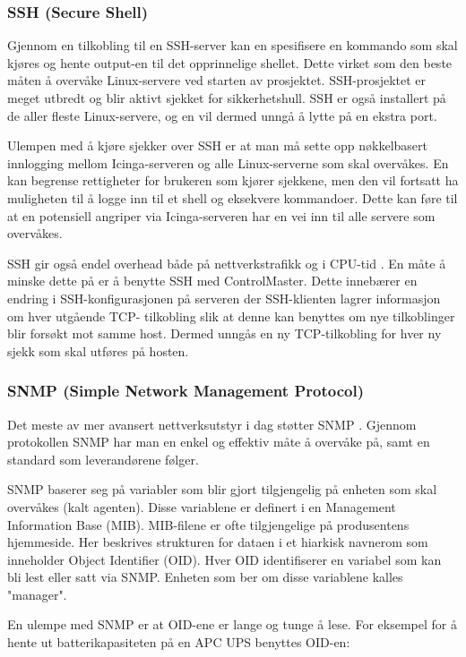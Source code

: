 \subsubsection{SSH (Secure Shell)}
Gjennom en tilkobling til en SSH-server kan en spesifisere en kommando som skal kjøres og hente output-en til det opprinnelige shellet. Dette virket som den beste måten å overvåke Linux-servere ved starten av prosjektet. SSH-prosjektet er meget utbredt og blir aktivt sjekket for sikkerhetshull. SSH er også installert på de aller fleste Linux-servere, og en vil dermed unngå å lytte på en ekstra port.

Ulempen med å kjøre sjekker over SSH er at man må sette opp nøkkelbasert innlogging mellom Icinga-serveren og alle Linux-serverne som skal overvåkes. En kan begrense rettigheter for brukeren som kjører sjekkene, men den vil fortsatt ha muligheten til å logge inn til et shell og eksekvere kommandoer. Dette kan føre til at en potensiell angriper via Icinga-serveren har en vei inn til alle servere som overvåkes.

SSH gir også endel overhead både på nettverkstrafikk og i CPU-tid \cite{sshmanpage}. En måte å minske dette på er å benytte SSH med ControlMaster. Dette innebærer en endring i SSH-konfigurasjonen på serveren der SSH-klienten lagrer informasjon om hver utgående TCP- tilkobling slik at denne kan benyttes om nye tilkoblinger blir forsøkt mot samme host. Dermed unngås en ny TCP-tilkobling for hver ny sjekk som skal utføres på hosten.

\subsubsection{SNMP (Simple Network Management Protocol)}
Det meste av mer avansert nettverksutstyr i dag støtter SNMP \cite{essentialsnmp}. Gjennom protokollen SNMP har man en enkel og effektiv måte å overvåke på, samt en standard som leverandørene følger.
	
SNMP baserer seg på variabler som blir gjort tilgjengelig på enheten som skal overvåkes (kalt agenten). Disse variablene er definert i en Management Information Base (MIB). MIB-filene er ofte tilgjengelige på produsentens hjemmeside. Her beskrives strukturen for dataen i et hiarkisk navnerom som inneholder Object Identifier (OID). Hver OID identifiserer en variabel som kan bli lest eller satt via SNMP. Enheten som ber om disse variablene kalles "manager". 

En ulempe med SNMP er at OID-ene er lange og tunge å lese. For eksempel for å hente ut batterikapasiteten på en APC UPS benyttes OID-en:


